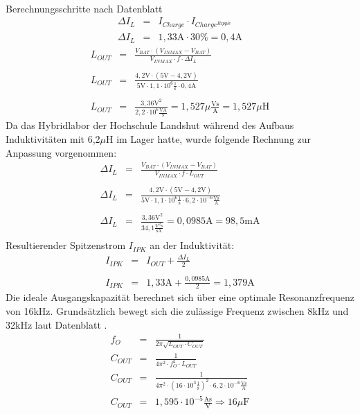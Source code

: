 \documentclass[12pt]{scrreprt} %
\begin{document}
\\
Berechnungsschritte nach Datenblatt \citep{BQ24100}
\begin{eqnarray}
\Delta I_L &=& I_{Charge} \cdot I_{Charge^{Ripple}}\\
\Delta I_L &=& 1,33 \text{A} \cdot 30 \% = 0,4\text{A}
\end{eqnarray}
\begin{eqnarray}
L_{OUT}&=&\frac{V_{BAT} \cdot \left( V_{INMAX} - V_{BAT} \right)}{V_{INMAX} \cdot f \cdot \Delta I_L}\\
\nonumber\\
L_{OUT}&=&\frac{4,2\text{V}\cdot \left(5\text{V}-4,2\text{V}\right)}{5\text{V} \cdot 1,1 \cdot 10^6 \frac{1}{\text{s}} \cdot 0,4\text{A}}\\
\nonumber\\
L_{OUT}&=&\frac{3,36 \text{V}^2}{2,2 \cdot 10^6  \frac{\text{VA}}{\text{s}}} = 1,527 \mu \frac{\text{Vs}}{\text{A}} = 1,527 \mu \text{H}
\end{eqnarray}
Da das Hybridlabor der Hochschule Landshut während des Aufbaus Induktivitäten mit 6,2$\mu$H im Lager hatte, wurde folgende Rechnung zur Anpassung vorgenommen:
\begin{eqnarray}
\Delta I_L&=&\frac{V_{BAT} \cdot \left( V_{INMAX} - V_{BAT} \right)}{V_{INMAX} \cdot f \cdot L_{OUT}}\\
\nonumber\\
\Delta I_L&=&\frac{4,2\text{V} \cdot \left(5\text{V}-4,2\text{V}\right)}{5\text{V} \cdot 1,1 \cdot 10^6 \frac{1}{\text{s}} \cdot 6,2 \cdot 10^{-6} \frac{\text{Vs}}{\text{A}}} \\
\nonumber\\
\Delta I_L& = & \frac{3,36 \text{V}^2}{34,1 \frac{\text{V}^2\text{s}}{\text{sA}}}=0,0985\text{A} = 98,5\text{mA}\\
\end{eqnarray}
Resultierender Spitzenstrom $I_{IPK}$ an der Induktivität:
\begin{eqnarray}
I_{IPK} &=& I_{OUT}+\frac{\Delta I_L}{2}\\
\nonumber\\
I_{IPK}&=& 1,33\text{A} + \frac{0,0985\text{A}}{2} = 1,379 \text{A}
\end{eqnarray}
Die ideale Ausgangskapazität berechnet sich über eine optimale Resonanzfrequenz von 16kHz. Grundsätzlich bewegt sich die zulässige Frequenz zwischen 8kHz und 32kHz laut Datenblatt \citep{BQ24100}. 
\begin{eqnarray}
f_O&=&\frac{1}{2 \pi \sqrt{L_{OUT} \cdot C_{OUT}}}\\
C_{OUT}&=&\frac{1}{4 \pi^2 \cdot f_O^2 \cdot L_{OUT}}\\
C_{OUT}&=&\frac{1}{4 \pi^2 \cdot \left( 16 \cdot 10^3 \frac{1}{\text{s}} \right)^2 \cdot 6,2 \cdot 10^{-6} \frac{\text{Vs}}{\text{A}}}\\
C_{OUT}&=&1,595 \cdot 10^{-5} \frac{\text{As}}{\text{V}} \Rightarrow 16 \mu \text{F}
\end{eqnarray}
\end{document}

